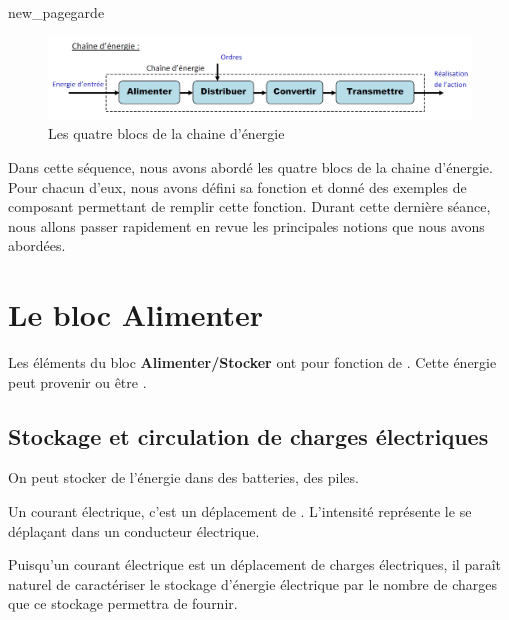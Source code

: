 \documentclass[10pt,fleqn]{article} %
\begin{document}
{new_pagegarde}

\begin{figure}[h]
  \includegraphics[width=\textwidth]{images/chaine}
  \caption{Les quatre blocs de la chaine d'énergie}
  \label{fig:chaine}
\end{figure}

Dans cette séquence, nous avons abordé les quatre blocs de la chaine d'énergie. Pour chacun d'eux, nous avons défini sa fonction et donné des exemples de composant permettant de remplir cette fonction. Durant cette dernière séance, nous allons passer rapidement en revue les principales notions que nous avons abordées.

\section{Le bloc Alimenter}
\begin{defi}
    Les éléments du bloc \textbf{Alimenter/Stocker} ont pour fonction de . Cette énergie peut provenir  ou être .
\end{defi}

\subsection{Stockage et circulation de charges électriques}
On peut stocker de l'énergie dans des batteries, des piles.

\begin{aretenir}
  Un courant électrique, c'est un déplacement de . L'intensité représente le  se déplaçant dans un conducteur électrique.

   \hfill {}
\end{aretenir}

Puisqu'un courant électrique est un déplacement de charges électriques, il paraît naturel de caractériser le stockage d'énergie électrique par le nombre de charges que ce stockage permettra de fournir.
\end{document}
